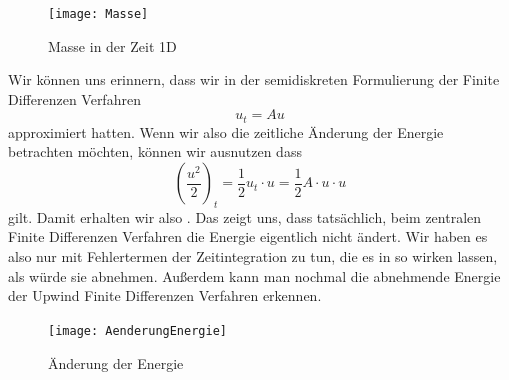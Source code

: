 \documentclass[12pt,a4paper]{scrartcl}
\numberwithin{equation}{section} %
\theoremstyle{definition}
\theoremstyle{plain}
\begin{document}
\begin{figure}[t]
\centering
\texttt{[image: Masse]}
\caption{Masse in der Zeit 1D}
\label{fig:Masse}
\end{figure}
\par Wir können uns erinnern, dass wir in der semidiskreten Formulierung der Finite Differenzen Verfahren 
\begin{equation}
u_t=Au
\end{equation} approximiert hatten. Wenn wir also die zeitliche Änderung der Energie betrachten möchten, können wir ausnutzen dass
\begin{equation}
\left(\frac{u^2}{2}\right)_t=\frac{1}{2}u_t\cdot u=\frac{1}{2}A\cdot u\cdot u
\end{equation} gilt. Damit erhalten wir also . Das zeigt uns, dass tatsächlich, beim zentralen Finite Differenzen Verfahren die Energie eigentlich nicht ändert. Wir haben es also nur mit Fehlertermen der Zeitintegration zu tun, die es in  so wirken lassen, als würde sie abnehmen. Außerdem kann man nochmal die abnehmende Energie der Upwind Finite Differenzen Verfahren erkennen.
\begin{figure}[h]
\centering
\texttt{[image: AenderungEnergie]}
\caption{Änderung der Energie}
\label{fig:Enaen}
\end{figure}
\end{document}
